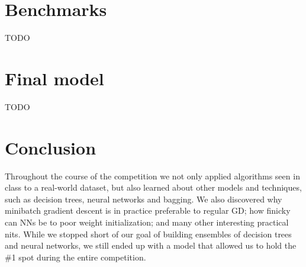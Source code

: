 \documentclass[10pt,conference,compsocconf]{IEEEtran}
\begin{document}
\section{Benchmarks}

TODO

\section{Final model}

TODO

\section{Conclusion}

Throughout the course of the competition we not only applied algorithms seen in class to a real-world dataset, but also learned about other models and techniques, such as decision trees, neural networks and bagging. We also discovered why minibatch gradient descent is in practice preferable to regular GD; how finicky can NNs be to poor weight initialization; and many other interesting practical nits.
While we stopped short of our goal of building ensembles of decision trees and neural networks, we still ended up with a model that allowed us to hold the \#1 spot during the entire competition.



\end{document}
